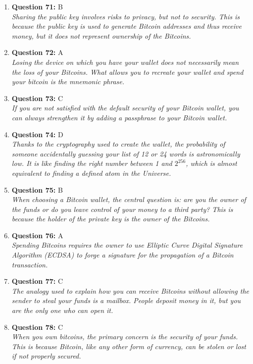 \documentclass[12pt,a4paper]{article}
\begin{document}
\begin{enumerate}
\item \textbf{Question 71:} B
\\ \textit{Sharing the public key involves risks to privacy, but not to security. This is because the public key is used to generate Bitcoin addresses and thus receive money, but it does not represent ownership of the Bitcoins.}

\item \textbf{Question 72:} A
\\ \textit{Losing the device on which you have your wallet does not necessarily mean the loss of your Bitcoins. What allows you to recreate your wallet and spend your bitcoin is the mnemonic phrase.}

\item \textbf{Question 73:} C
\\ \textit{If you are not satisfied with the default security of your Bitcoin wallet, you can always strengthen it by adding a passphrase to your Bitcoin wallet.}

\item \textbf{Question 74:} D
\\ \textit{Thanks to the cryptography used to create the wallet, the probability of someone accidentally guessing your list of 12 or 24 words is astronomically low. It is like finding the right number between 1 and $2^256$, which is almost equivalent to finding a defined atom in the Universe.}

\item \textbf{Question 75:} B
\\ \textit{When choosing a Bitcoin wallet, the central question is: are you the owner of the funds or do you leave control of your money to a third party? This is because the holder of the private key is the owner of the Bitcoins.}

\item \textbf{Question 76:} A
\\ \textit{Spending Bitcoins requires the owner to use Elliptic Curve Digital Signature Algorithm (ECDSA) to forge a signature for the propagation of a Bitcoin transaction.}

\item \textbf{Question 77:} C
\\ \textit{The analogy used to explain how you can receive Bitcoins without allowing the sender to steal your funds is a mailbox. People deposit money in it, but you are the only one who can open it.}

\item \textbf{Question 78:} C
\\ \textit{When you own bitcoins, the primary concern is the security of your funds. This is because Bitcoin, like any other form of currency, can be stolen or lost if not properly secured.}


\end{enumerate}
\end{document}
